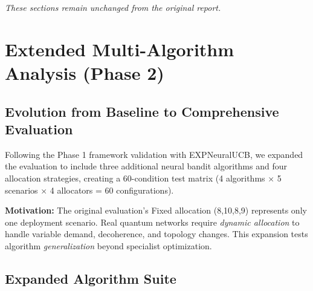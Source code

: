 \documentclass[11pt,a4paper]{article}
\begin{document}
\textit{These sections remain unchanged from the original report.}

\newpage


\section{Extended Multi-Algorithm Analysis (Phase 2)}

\subsection{Evolution from Baseline to Comprehensive Evaluation}

Following the Phase 1 framework validation with EXPNeuralUCB, we expanded the evaluation to include three additional neural bandit algorithms and four allocation strategies, creating a 60-condition test matrix (4 algorithms × 5 scenarios × 4 allocators = 60 configurations).

\textbf{Motivation:} The original evaluation's Fixed allocation (8,10,8,9) represents only one deployment scenario. Real quantum networks require \textit{dynamic allocation} to handle variable demand, decoherence, and topology changes. This expansion tests algorithm \textit{generalization} beyond specialist optimization.

\subsection{Expanded Algorithm Suite}
\end{document}
